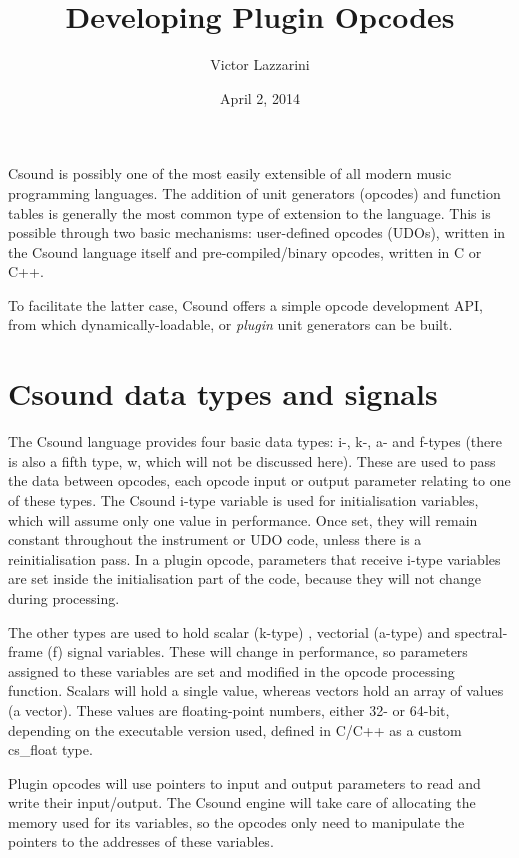 \documentclass[11pt]{article}
\begin{document}
\title{Developing Plugin Opcodes}
\author{Victor Lazzarini}
\date{April 2, 2014}
\maketitle


Csound is possibly one of the most easily extensible of all modern music programming languages. The addition of unit generators (opcodes) and function tables is generally the most common type of extension to the language. This is possible through two basic mechanisms: user-defined opcodes (UDOs), written in the Csound language itself and pre-compiled/binary opcodes, written in C or C++.  

To facilitate the latter case, Csound offers a simple opcode development API, from which dynamically-loadable, or \emph{plugin} unit generators can be built. 

\section{ Csound data types and signals}

The Csound language provides four basic data types: i-, k-, a- and f-types  (there is also a fifth type, w, which will not be discussed here). These are used to pass the data between opcodes, each opcode input or output parameter relating to one of these types. The Csound i-type variable is used for initialisation variables, which will assume only one value in performance. Once set, they will remain constant throughout the instrument or UDO code, unless there is a reinitialisation pass. In a plugin opcode, parameters that receive i-type variables are set inside the initialisation part of the code, because they will not change during processing.

The other types are used to hold scalar (k-type) , vectorial (a-type)  and spectral-frame (f) signal variables. These will change in performance, so parameters assigned to these variables are set and modified in the opcode processing function. Scalars will hold a single value, whereas vectors hold an array of values (a vector). These values are floating-point numbers, either 32- or 64-bit, depending on the executable version used, defined in C/C++ as a custom cs_float type.

Plugin opcodes will use pointers to input and output parameters to read and write their input/output. The Csound engine will take care of allocating the memory used for its variables, so the opcodes only need to manipulate the pointers to the addresses of these variables. 
\end{document}
